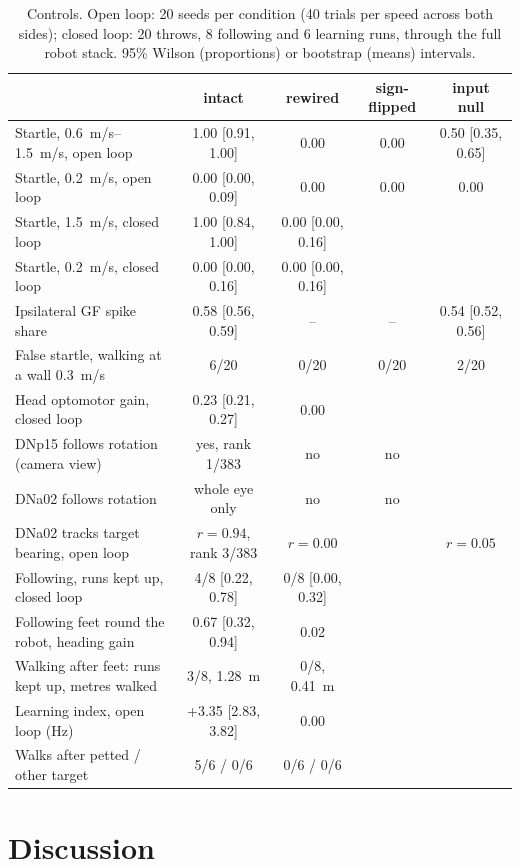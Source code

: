 \documentclass[10pt,a4paper]{article}
\begin{document}
\begin{table}[t]
\centering\small
\caption{Controls. Open loop: 20 seeds per condition (40 trials per speed across both sides); closed loop:
20 throws, 8 following and 6 learning runs, through the full robot stack. 95\% Wilson (proportions) or bootstrap (means) intervals.}
\label{tab:controls}
\begin{tabular}{lcccc}
\toprule
 & intact & rewired & sign-flipped & input null \\
\midrule
Startle, \SIrange{0.6}{1.5}{m/s}, open loop & 1.00 [0.91, 1.00] & 0.00 & 0.00 & 0.50 [0.35, 0.65] \\
Startle, \SI{0.2}{m/s}, open loop & 0.00 [0.00, 0.09] & 0.00 & 0.00 & 0.00 \\
Startle, \SI{1.5}{m/s}, closed loop & 1.00 [0.84, 1.00] & 0.00 [0.00, 0.16] & & \\
Startle, \SI{0.2}{m/s}, closed loop & 0.00 [0.00, 0.16] & 0.00 [0.00, 0.16] & & \\
Ipsilateral GF spike share & 0.58 [0.56, 0.59] & -- & -- & 0.54 [0.52, 0.56] \\
False startle, walking at a wall \SI{0.3}{m/s} & 6/20 & 0/20 & 0/20 & 2/20 \\
Head optomotor gain, closed loop & 0.23 [0.21, 0.27] & 0.00 & & \\
DNp15 follows rotation (camera view) & yes, rank 1/383 & no & no & \\
DNa02 follows rotation & whole eye only & no & no & \\
DNa02 tracks target bearing, open loop & $r = 0.94$, rank 3/383 & $r = 0.00$ & & $r = 0.05$ \\
Following, runs kept up, closed loop & 4/8 [0.22, 0.78] & 0/8 [0.00, 0.32] & & \\
Following feet round the robot, heading gain & 0.67 [0.32, 0.94] & 0.02 & & \\
Walking after feet: runs kept up, metres walked & 3/8, \SI{1.28}{m} & 0/8, \SI{0.41}{m} & & \\
Learning index, open loop (Hz) & +3.35 [2.83, 3.82] & 0.00 & & \\
Walks after petted / other target & 5/6 / 0/6 & 0/6 / 0/6 & & \\
\bottomrule
\end{tabular}
\end{table}

\section{Discussion}
\end{document}

